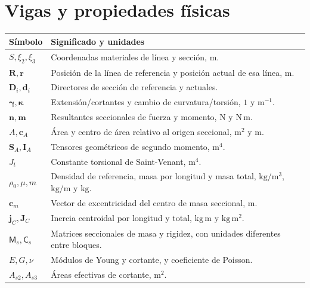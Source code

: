 \documentclass[11pt,a4paper,oneside]{report}
\newcommand{\vct}[1]{\bm{#1}}
\newcommand{\ten}[1]{\boldsymbol{#1}}
\begin{document}
\section{Vigas y propiedades físicas}
\begin{longtable}{p{}p{}}
\toprule Símbolo & Significado y unidades \\\midrule\endhead
$S,\xi_2,\xi_3$ & Coordenadas materiales de línea y sección, $\mathrm m$.\\
$\vct R,\vct r$ & Posición de la línea de referencia y posición actual de esa línea, $\mathrm m$.\\
$\vct D_i,\vct d_i$ & Directores de sección de referencia y actuales.\\
$\vct\gamma,\vct\kappa$ & Extensión/cortantes y cambio de curvatura/torsión, $1$ y $\mathrm{m^{-1}}$.\\
$\vct n,\vct m$ & Resultantes seccionales de fuerza y momento, $\mathrm N$ y $\mathrm{N\,m}$.\\
$A,\vct c_A$ & Área y centro de área relativo al origen seccional, $\mathrm{m^2}$ y $\mathrm m$.\\
$\ten S_A,\ten I_A$ & Tensores geométricos de segundo momento, $\mathrm{m^4}$.\\
$J_t$ & Constante torsional de Saint-Venant, $\mathrm{m^4}$.\\
$\rho_0,\mu,m$ & Densidad de referencia, masa por longitud y masa total, $\mathrm{kg/m^3}$, $\mathrm{kg/m}$ y $\mathrm{kg}$.\\
$\vct c_m$ & Vector de excentricidad del centro de masa seccional, $\mathrm m$.\\
$\ten j_C,\ten J_C$ & Inercia centroidal por longitud y total, $\mathrm{kg\,m}$ y $\mathrm{kg\,m^2}$.\\
$\mathsf M_s,\mathsf C_s$ & Matrices seccionales de masa y rigidez, con unidades diferentes entre bloques.\\
$E,G,\nu$ & Módulos de Young y cortante, y coeficiente de Poisson.\\
$A_{s2},A_{s3}$ & Áreas efectivas de cortante, $\mathrm{m^2}$.\\
\bottomrule
\end{longtable}
\end{document}
